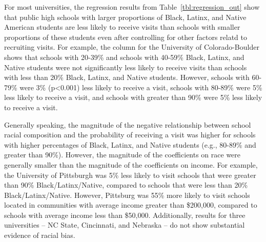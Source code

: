 \documentclass[twoside]{article}
\begin{document}
For most universities, the regression results from Table~\ref{tbl:regression_out} show that public high schools with larger proportions of Black, Latinx, and Native American students are less likely to receive visits than schools with smaller proportions of these students even after controlling for other factors relatd to recruiting visits. For example, the column for the University of Colorado-Boulder shows that schools with 20-39\% and schools with 40-59\% Black, Latinx, and Native students were not significantly less likely to receive visits than schools with less than 20\% Black, Latinx, and Native students.  However, schools with 60-79\% were 3\% (p<0.001) less likely to receive a visit, schools with 80-89\% were 5\% less likely to receive a visit, and schools with greater than 90\% were 5\% less likely to receive a visit.


Generally speaking, the magnitude of the negative relationship between school racial composition and the probability of receiving a visit was higher for schools with higher percentages of Black, Latinx, and Native students (e.g., 80-89\% and greater than 90\%). However, the magnitude of the coefficients on race were generally smaller than the magnitude of the coefficients on income. For example, the University of Pittsburgh was 5\% less likely to visit schools that were greater than 90\% Black/Latinx/Native, compared to schools that were less than 20\% Black/Latinx/Native. However, Pittsburg was 55\% more likely to visit schools located in communities with average income greater than \$200,000, compared to schools with average income less than \$50,000. Additionally, results for three universities -- NC State, Cincinnati, and Nebraska -- do not show substantial evidence of racial bias.
\end{document}
